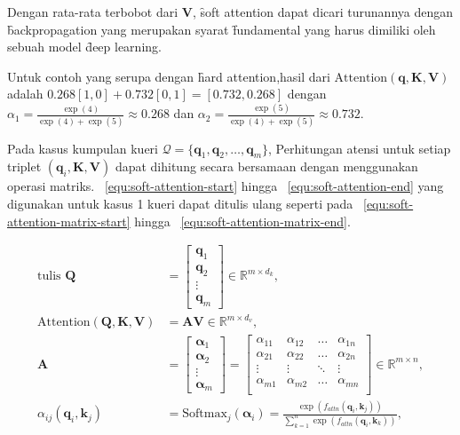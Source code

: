 	Dengan rata-rata terbobot dari $\mathbf{V}$, \f{soft attention} dapat dicari turunannya dengan \f{backpropagation} yang merupakan syarat \f{fundamental} yang harus dimiliki oleh sebuah model \f{deep learning}.

	Untuk contoh yang serupa dengan \f{hard attention},hasil dari $\text{Attention}(\mathbf{q}, \mathbf{K}, \mathbf{V})$ adalah $0.268 [1,0] + 0.732 [0,1] = [0.732, 0.268]$ dengan $\alpha_1 = \frac{\exp(4)}{\exp(4) + \exp(5)} \approx 0.268$ dan $\alpha_2 = \frac{\exp(5)}{\exp(4) + \exp(5)} \approx 0.732$.

	Pada kasus kumpulan kueri $\mathcal{Q} = \{\mathbf{q}_1, \mathbf{q}_2, \dots, \mathbf{q}_m\}$, Perhitungan atensi untuk setiap triplet $(\mathbf{q}_i, \mathbf{K}, \mathbf{V})$ dapat dihitung secara bersamaan dengan menggunakan operasi matriks. \equ~\ref{equ:soft-attention-start} hingga \equ~\ref{equ:soft-attention-end} yang digunakan untuk kasus 1 kueri dapat ditulis ulang seperti pada \equ~\ref{equ:soft-attention-matrix-start} hingga \equ~\ref{equ:soft-attention-matrix-end}.

	\begin{align}
		\label{equ:soft-attention-matrix-start}
		\text{tulis }\mathbf{Q} &= \begin{bmatrix}
			\mathbf{q}_1 \\
			\mathbf{q}_2 \\
			\vdots \\
			\mathbf{q}_m
		\end{bmatrix} \in \mathbb{R}^{m \times d_k}, \\
		\text{Attention}(\mathbf{Q}, \mathbf{K}, \mathbf{V}) &= \mathbf{A} \mathbf{V} \in \mathbb{R}^{m \times d_v},\\
		\mathbf{A} &= \begin{bmatrix}
			\bm{\alpha}_1 \\
			\bm{\alpha}_2 \\
			\vdots \\
			\bm{\alpha}_m
		\end{bmatrix} = \begin{bmatrix}
			\alpha_{11} & \alpha_{12} & \dots & \alpha_{1n} \\
			\alpha_{21} & \alpha_{22} & \dots & \alpha_{2n} \\
			\vdots & \vdots & \ddots & \vdots \\
			\alpha_{m1} & \alpha_{m2} & \dots & \alpha_{mn} \\
		\end{bmatrix} \in \mathbb{R}^{m \times n}, \\
		\label{equ:soft-attention-matrix-end}
		\alpha_{ij}(\mathbf{q}_i, \mathbf{k}_j) &= \text{Softmax}_j(\mathbf{\alpha}_i) = \frac{\exp(f_{attn}(\mathbf{q}_i, \mathbf{k}_j))}{\sum_{k=1}^{n} \exp(f_{attn}(\mathbf{q}_i, \mathbf{k}_k))},
	\end{align}

